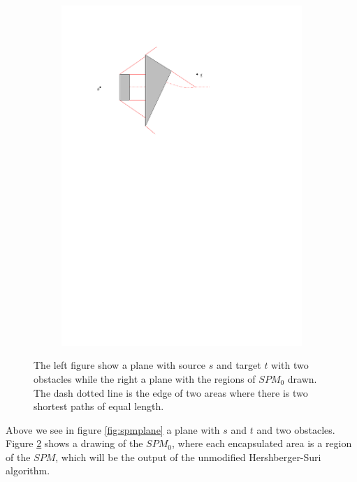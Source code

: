 \begin{figure}[H]
\begin{subfigure}{.5\textwidth}
  \centering
  \includegraphics[width=.95\linewidth]{figures/spm0.pdf}
  \caption{}
  \label{fig:planewithspm0drawn}
\end{subfigure}
\caption{The left figure show a plane with source $s$ and target $t$ with two obstacles while the 
         right a plane with the regions of $SPM_0$ drawn. The dash dotted line is the edge of two 
  		 areas where there is two shortest paths of equal length.}
\end{figure}

Above we see in figure \ref{fig:spmplane} a plane with $s$ and $t$ and two obstacles. Figure 
\ref{fig:planewithspm0drawn} shows a drawing of the $SPM_0$, where each encapsulated area is 
a region of the $SPM$, which will be the output of the unmodified Hershberger-Suri algorithm. 

